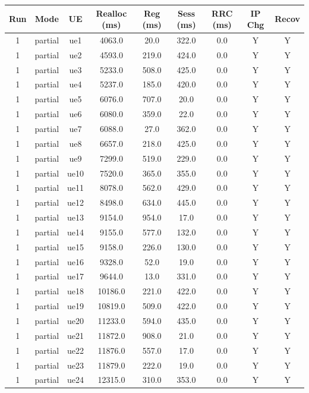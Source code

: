 \begin{table}[ht]
\centering
\begin{tabular}{|c|c|c|c|c|c|c|c|c|}
\hline
Run & Mode & UE & Realloc (ms) & Reg (ms) & Sess (ms) & RRC (ms) & IP Chg & Recov \\
\hline
1 & partial & ue1 & 4063.0 & 20.0 & 322.0 & 0.0 & Y & Y \\
1 & partial & ue2 & 4593.0 & 219.0 & 424.0 & 0.0 & Y & Y \\
1 & partial & ue3 & 5233.0 & 508.0 & 425.0 & 0.0 & Y & Y \\
1 & partial & ue4 & 5237.0 & 185.0 & 420.0 & 0.0 & Y & Y \\
1 & partial & ue5 & 6076.0 & 707.0 & 20.0 & 0.0 & Y & Y \\
1 & partial & ue6 & 6080.0 & 359.0 & 22.0 & 0.0 & Y & Y \\
1 & partial & ue7 & 6088.0 & 27.0 & 362.0 & 0.0 & Y & Y \\
1 & partial & ue8 & 6657.0 & 218.0 & 425.0 & 0.0 & Y & Y \\
1 & partial & ue9 & 7299.0 & 519.0 & 229.0 & 0.0 & Y & Y \\
1 & partial & ue10 & 7520.0 & 365.0 & 355.0 & 0.0 & Y & Y \\
1 & partial & ue11 & 8078.0 & 562.0 & 429.0 & 0.0 & Y & Y \\
1 & partial & ue12 & 8498.0 & 634.0 & 445.0 & 0.0 & Y & Y \\
1 & partial & ue13 & 9154.0 & 954.0 & 17.0 & 0.0 & Y & Y \\
1 & partial & ue14 & 9155.0 & 577.0 & 132.0 & 0.0 & Y & Y \\
1 & partial & ue15 & 9158.0 & 226.0 & 130.0 & 0.0 & Y & Y \\
1 & partial & ue16 & 9328.0 & 52.0 & 19.0 & 0.0 & Y & Y \\
1 & partial & ue17 & 9644.0 & 13.0 & 331.0 & 0.0 & Y & Y \\
1 & partial & ue18 & 10186.0 & 221.0 & 422.0 & 0.0 & Y & Y \\
1 & partial & ue19 & 10819.0 & 509.0 & 422.0 & 0.0 & Y & Y \\
1 & partial & ue20 & 11233.0 & 594.0 & 435.0 & 0.0 & Y & Y \\
1 & partial & ue21 & 11872.0 & 908.0 & 21.0 & 0.0 & Y & Y \\
1 & partial & ue22 & 11876.0 & 557.0 & 17.0 & 0.0 & Y & Y \\
1 & partial & ue23 & 11879.0 & 222.0 & 19.0 & 0.0 & Y & Y \\
1 & partial & ue24 & 12315.0 & 310.0 & 353.0 & 0.0 & Y & Y \\

\end{tabular}
\end{table}
